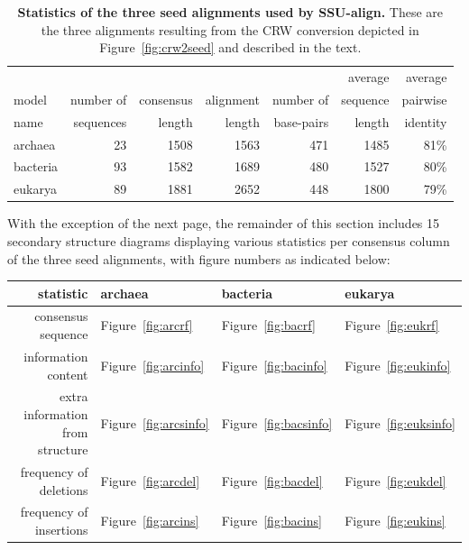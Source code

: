 \begin{table}
\begin{center}
\begin{tabular}{lrrrrrr} \hline
        &           &           &           &           & average   & average  \\
model   & number of & consensus & alignment & number of & sequence  & pairwise \\
name    & sequences & length    & length    & base-pairs & length    & identity \\ \hline
archaea & 23        & 1508      & 1563      & 471       & 1485      & 81\%     \\
bacteria& 93        & 1582      & 1689      & 480       & 1527      & 80\%     \\
eukarya  & 89       & 1881      & 2652      & 448       & 1800      & 79\%     \\ 
\end{tabular}
\caption[Statistics of the three seed alignments used by SSU-align.]
{\textbf{Statistics of the three seed alignments used by
    SSU-align.} These are the three alignments resulting from the
    CRW conversion depicted in Figure~\ref{fig:crw2seed} and
    described in the text.}
\label{tbl:finalseeds}
\end{center}
\end{table}

With the exception of the next page, the remainder of this section
includes 15 secondary structure diagrams displaying various statistics
per consensus column of the three seed alignments, with figure numbers
as indicated below:

\vspace{0.2in}

\begin{center}
\begin{tabular}{r|l|l|l} \hline
statistic                        & archaea & bacteria & eukarya \\ \hline
consensus sequence               & Figure~\ref{fig:arcrf}  & Figure~\ref{fig:bacrf} & Figure~\ref{fig:eukrf} \\ 
information content              & Figure~\ref{fig:arcinfo} & Figure~\ref{fig:bacinfo} & Figure~\ref{fig:eukinfo} \\ 
extra information from structure & Figure~\ref{fig:arcsinfo} & Figure~\ref{fig:bacsinfo} & Figure~\ref{fig:euksinfo} \\ 
frequency of deletions           & Figure~\ref{fig:arcdel} & Figure~\ref{fig:bacdel} & Figure~\ref{fig:eukdel} \\ 
frequency of insertions          & Figure~\ref{fig:arcins} & Figure~\ref{fig:bacins} & Figure~\ref{fig:eukins} \\ 
\end{tabular}
\end{center}

